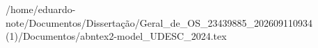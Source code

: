 /home/eduardo-note/Documentos/Dissertação/Geral_de_OS_23439885_202609110934 (1)/Documentos/abntex2-model_UDESC_2024.tex